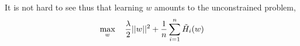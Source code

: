 It is not hard to see thus that learning $w$ amounts to the unconstrained problem,
\begin{equation*}
\begin{aligned}
    \max_{w} \quad\frac{\lambda}{2}||w||^{2}+ \frac{1}{n}\sum_{i=1}^{n}\Tilde{H}_{i}(w)
\end{aligned}
\end{equation*}

